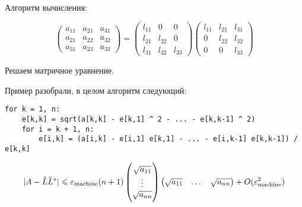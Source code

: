 Алгоритм вычисления:

\[
    \begin{pmatrix}
        a_{11} & a_{21} & a_{31} \\
        a_{21} & a_{22} & a_{32} \\
        a_{31} & a_{23} & a_{33}
    \end{pmatrix}
    = \begin{pmatrix}
        l_{11} & 0 & 0 \\
        l_{21} & l_{22} & 0 \\
        l_{31} & l_{32} & l_{33}
    \end{pmatrix}
    \begin{pmatrix}
        l_{11} & l_{21} & l_{31} \\
        0 & l_{22} & l_{32} \\
        0 & 0 & l_{33}
    \end{pmatrix}
\]

Решаем матричное уравнение.

Пример разобрали, в целом алгоритм следующий:

\begin{verbatim}
for k = 1, n:
    e[k,k] = sqrt(a[k,k] - e[k,1] ^ 2 - ... - e[k,k-1] ^ 2)
    for i = k + 1, n:
        e[i,k] = (a[i,k] - e[i,1] e[k,1] - ... - e[i,k-1] e[k,k-1]) / e[k,k]
\end{verbatim}

\begin{theorem}
    \[
        |A - \tilde{L} \tilde{L}^*| \leqslant \varepsilon_{\text{machine}} (n + 1)
        \begin{pmatrix} \sqrt{a_{11}} \\ \vdots \\ \sqrt{a_{nn}} \end{pmatrix}
        \begin{pmatrix} \sqrt{a_{11}} & \dots & \sqrt{a_{nn}} \end{pmatrix}
        + O(\varepsilon_{\text{machine}}^2)
    \]
\end{theorem}
